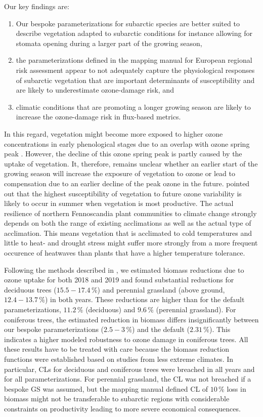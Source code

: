 \documentclass[bg, manuscript]{copernicus}
\begin{document}
Our key findings are: 
\begin{enumerate}
\item Our bespoke parameterizations for subarctic species are better suited to describe vegetation adapted to subarctic conditions for instance allowing for stomata opening during a larger part of the growing season, 
\item the parameterizations defined in the mapping manual for European regional risk assessment appear to not adequately capture the physiological responses of subarctic vegetation that are important determinants of  susceptibility and are likely to underestimate ozone-damage risk, and 
\item climatic conditions that are promoting a longer growing season are likely to increase the ozone-damage risk in flux-based metrics.
\end{enumerate}

In this regard, vegetation might become more exposed to higher ozone concentrations in early phenological stages due to an overlap with ozone spring peak \citep{EP:Karlsson2007}. However, the decline of this ozone spring peak is partly caused by the uptake of vegetation. It, therefore, remains unclear whether an earlier start of the growing season will increase the exposure of vegetation to ozone or lead to compensation due to an earlier decline of the peak ozone in the future. \citet{ESPR:Hayes2021} pointed out that the highest susceptibility of vegetation to future ozone variability is likely to occur in summer when vegetation is most productive. The actual resilience of northern Fennoscandia plant communities to climate change strongly depends on both the range of existing acclimations as well as the actual type of acclimation. This means vegetation that is acclimated to cold temperatures and little to heat- and drought stress might suffer more strongly from a more frequent occurence of heatwaves than plants that have a higher temperature tolerance.

Following the methods described in \citet{ICP:MappingManual2017}, we estimated biomass reductions due to ozone uptake for both 2018 and 2019 and found substantial reductions for deciduous trees ($15.5-17.4\,\unit{\%}$) and perennial grassland (above ground, $12.4-13.7\,\unit{\%}$) in both years. These reductions are higher than for the default parameterizations, $11.2\,\unit{\%}$ (deciduous) and $9.6\,\unit{\%}$ (perennial grassland). For coniferous trees, the estimated reduction in biomass differs insignificantly between our bespoke parameterizations ($2.5-3\,\unit{\%}$) and the default ($2.31\,\unit{\%}$). This indicates a higher modeled robustness to ozone damage in coniferous trees. All these results have to be treated with care because the biomass reduction functions were established based on studies from less extreme climates. In particular, CLs for deciduous and coniferous trees were breached in all years and for all parameterizations. For perennial grassland, the CL was not breached if a bespoke GS was assumed, but the mapping manual defined CL of $10\,\unit{\%}$ loss in biomass might not be transferable to subarctic regions with considerable constraints on productivity leading to more severe economical consequences.
\end{document}
